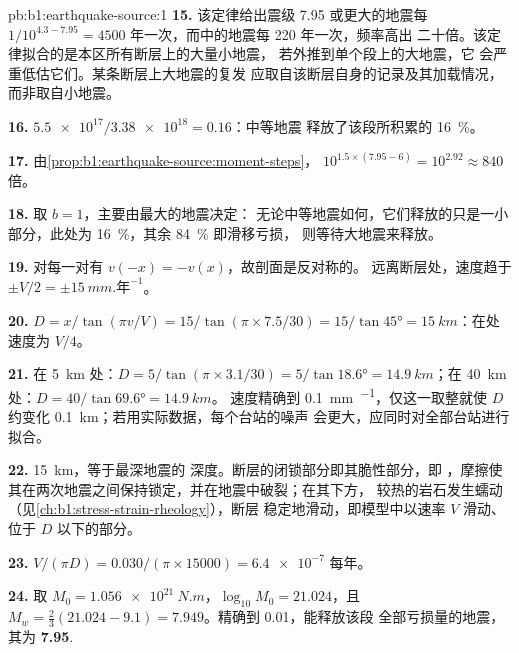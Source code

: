 \begin{solution}{pb:b1:earthquake-source:1}
\textbf{15.} 该定律给出震级 7.95 或更大的地震每
$1/10^{4.3 - 7.95} = \num{4500}$ 年一次，而中的地震每 220 年一次，频率高出
二十倍。该定律拟合的是本区所有断层上的大量小地震，
若外推到单个段上的大地震，它
会严重低估它们。某条断层上大地震的复发
应取自该断层自身的记录及其加载情况，而非取自小地震。

\textbf{16.} $\num{5.5e17}/\num{3.38e18} = 0.16$：中等地震
释放了该段所积累的 \qty{16}{\percent}。

\textbf{17.} 由\cref{prop:b1:earthquake-source:moment-steps}，
$10^{1.5\times(7.95 - 6)} = 10^{2.92} \approx 840$ 倍。

\textbf{18.} 取 $b = 1$，主要由最大的地震决定：
无论中等地震如何，它们释放的只是一小部分，此处为
\qty{16}{\percent}，其余 \qty{84}{\percent} 即滑移亏损，
则等待大地震来释放。

\textbf{19.} 对每一对有 $v(-x) = -v(x)$，故剖面是反对称的。
远离断层处，速度趋于 $\pm V/2 = \pm\qty{15}{mm.\text{年}^{-1}}$。

\textbf{20.} $D = x/\tan(\pi v/V) = 15/\tan(\pi\times7.5/30) = 15/\tan\ang{45} =
\qty{15}{km}$：在处速度为 $V/4$。

\textbf{21.} 在 \qty{5}{km} 处：$D = 5/\tan(\pi\times3.1/30) = 5/\tan\ang{18.6} =
\qty{14.9}{km}$；在 \qty{40}{km} 处：$D = 40/\tan\ang{69.6} = \qty{14.9}{km}$。
速度精确到 \qty{0.1}{mm.^{-1}}，仅这一取整就使
$D$ 约变化 \qty{0.1}{km}；若用实际数据，每个台站的噪声
会更大，应同时对全部台站进行拟合。

\textbf{22.}  \qty{15}{km}，等于最深地震的
深度。断层的闭锁部分即其脆性部分，即
，摩擦使其在两次地震之间保持锁定，并在地震中破裂；在其下方，
较热的岩石发生蠕动（见\cref{ch:b1:stress-strain-rheology}），断层
稳定地滑动，即模型中以速率 $V$ 滑动、位于 $D$ 以下的部分。

\textbf{23.} $V/(\pi D) = \num{0.030}/(\pi\times\num{15000}) = \num{6.4e-7}$
每年。

\textbf{24.} 取 $M_0 = \qty{1.056e21}{N.m}$，$\log_{10}M_0 = 21.024$，且
$M_w = \tfrac23(21.024 - 9.1) = 7.949$。精确到 0.01，能释放该段
全部亏损量的地震，其为
\textbf{7.95}.
\end{solution}
